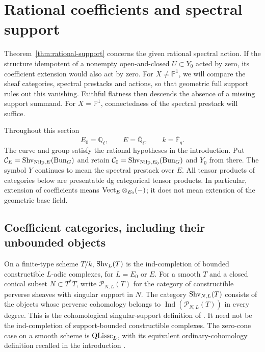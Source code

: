 \section{Rational coefficients and spectral support}
\label{sec:coefficients}

Theorem~\ref{thm:rational-support} concerns the given rational spectral
action. If the structure idempotent of a nonempty open-and-closed
$U\subset Y_0$ acted by zero, its coefficient extension would also act
by zero. For $X\ne\mathbb P^1$, we will compare the sheaf categories,
spectral prestacks and actions, so that geometric full support rules
out this vanishing. Faithful flatness then descends the absence of a
missing support summand. For $X=\mathbb P^1$, connectedness of the
spectral prestack will suffice.

Throughout this section
\[
 E_0=\mathbb Q_\ell,\qquad E=\overline{\mathbb Q}_\ell,
 \qquad k=\overline{\mathbb F}_q.
\]
The curve and group satisfy the rational hypotheses in the introduction.
Put $\mathcal C_E=\operatorname{Shv}_{\operatorname{Nilp},E}(\operatorname{Bun}_G)$ and retain
$\mathcal C_0=\operatorname{Shv}_{\operatorname{Nilp},E_0}(\operatorname{Bun}_G)$ and $Y_0$ from there.
The symbol $Y$ continues to mean the spectral prestack over $E$.
All tensor products of categories below are presentable dg categorical
tensor products. In particular, extension of coefficients means
$\operatorname{Vect}_E\otimes_{E_0}(-)$; it does not mean extension of the geometric
base field.

\subsection{Coefficient categories, including their unbounded objects}

On a finite-type scheme $T/k$, $\operatorname{Shv}_L(T)$ is the ind-completion of
bounded constructible $L$-adic complexes, for $L=E_0$ or $E$.
For a smooth $T$ and a closed conical subset $N\subset T^*T$, write
$\mathcal P_{N,L}(T)$ for the category of constructible perverse sheaves
with singular support in $N$. The category $\operatorname{Shv}_{N,L}(T)$ consists of
the objects whose perverse cohomology belongs to
$\operatorname{Ind}(\mathcal P_{N,L}(T))$ in every degree.
This is the cohomological singular-support definition of
\cite[\S\S E.5.1--E.5.8]{AGKRRV}. It need not be the ind-completion
of support-bounded constructible complexes. The zero-cone case on a
smooth scheme is $\operatorname{QLisse}_L$, with its equivalent ordinary-cohomology
definition recalled in the introduction
\cite[\S\S1.2.5--1.2.11]{AGKRRV}.

